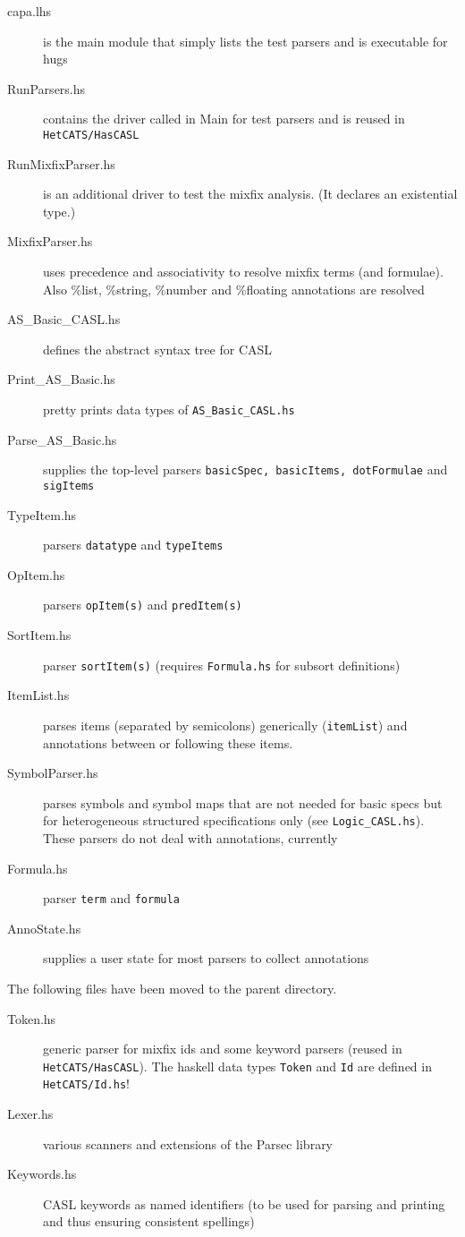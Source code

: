 \documentclass{article}
\begin{document}
\begin{description}
\item[capa.lhs] is the main module that simply lists the test parsers
  and is executable for hugs
\item[RunParsers.hs] contains the driver called in Main for test parsers and is reused in \texttt{HetCATS/HasCASL}
\item[RunMixfixParser.hs] is an additional driver to test the mixfix
  analysis. (It declares an existential type.)
\item[MixfixParser.hs] uses precedence and associativity to resolve
  mixfix terms (and formulae). Also \%list, \%string, \%number and
  \%floating annotations are resolved 
\item[AS\_Basic\_CASL.hs] defines the abstract syntax tree for CASL
\item[Print\_AS\_Basic.hs] pretty prints data types of
  \texttt{AS\_Basic\_CASL.hs}
\item[Parse\_AS\_Basic.hs] supplies the top-level parsers \texttt{basicSpec,
  basicItems, dotFormulae} and \texttt{sigItems}
\item[TypeItem.hs] parsers \texttt{datatype} and \texttt{typeItems}
\item[OpItem.hs] parsers \texttt{opItem(s)} and \texttt{predItem(s)}
\item[SortItem.hs] parser \texttt{sortItem(s)} (requires \texttt{Formula.hs} for subsort definitions)
\item[ItemList.hs] parses items (separated by semicolons) generically
  (\texttt{itemList}) and annotations between or following these
  items. 
\item[SymbolParser.hs] parses symbols and symbol maps that are not needed for
  basic specs but for heterogeneous structured specifications only (see
  \texttt{Logic\_CASL.hs}). These parsers do not deal with annotations,
  currently
\item[Formula.hs] parser \texttt{term} and \texttt{formula}
\item[AnnoState.hs] supplies a user state for most parsers to
  collect annotations
\end{description}

The following files have been moved to the parent directory.

\begin{description}
\item[Token.hs] generic parser for mixfix ids and some keyword parsers
  (reused in \texttt{HetCATS/HasCASL}). The haskell data types
  \texttt{Token} and \texttt{Id} are defined in \texttt{HetCATS/Id.hs}!
\item[Lexer.hs] various scanners and extensions of the Parsec library 
\item[Keywords.hs] CASL keywords as named identifiers (to be used
  for parsing and printing and thus ensuring consistent spellings)
\end{description}
\end{document}
